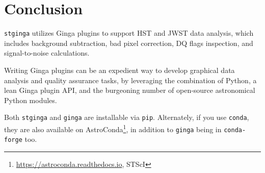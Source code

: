 \documentclass[11pt,twoside]{article}
\begin{document}
\section{Conclusion}

{\tt stginga} utilizes Ginga plugins to support HST and JWST data analysis,
which includes background subtraction, bad pixel correction, DQ flags
inspection, and signal-to-noise calculations.

Writing Ginga plugins can be an expedient way to develop graphical data
analysis and quality assurance tasks, by leveraging the combination of
Python, a lean Ginga plugin API, and the burgeoning number of open-source
astronomical Python modules.

Both {\tt stginga} and {\tt ginga} are installable via {\tt pip}. Alternately,
if you use {\tt conda}, they are also available on
AstroConda\footnote{\url{https://astroconda.readthedocs.io}, STScI},
in addition to {\tt ginga} being in  {\tt conda-forge} too.


\end{document}
